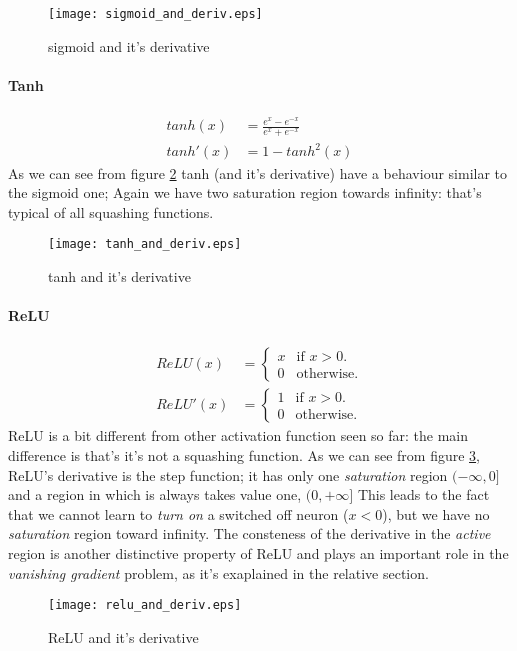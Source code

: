 \begin{figure}[ht]
  \centering
    \texttt{[image: sigmoid\_and\_deriv.eps]}
  \caption{sigmoid and it's derivative}
\label{sigmoid_plot}
\end{figure}

\paragraph{Tanh}
\begin{align}
 tanh(x)&=\frac{e^x-e^{-x}}{e^x+e^{-x}} \\
 tanh'(x)&= 1 - tanh^2(x)  
\end{align}
As we can see from figure \ref{tanh_plot} tanh (and it's derivative) have a behaviour similar to the sigmoid one; Again we have two saturation region towards
infinity: that's typical of all squashing functions.



\begin{figure}[ht]
  \centering
    \texttt{[image: tanh\_and\_deriv.eps]}
  \caption{tanh and it's derivative}
\label{tanh_plot}
\end{figure}



\paragraph{ReLU}


\begin{align}
  ReLU(x)&=\begin{cases}
    x & \text{if $x>0$}.\\
    0 & \text{otherwise}.
  \end{cases} \\ 
   ReLU'(x)&=\begin{cases}
    1 & \text{if $x>0$}.\\
    0 & \text{otherwise}.
  \end{cases}
\end{align}
ReLU is a bit different from other activation function seen so far: the main difference is that's it's not a squashing function.
As we can see from figure \ref{relu_plot}, ReLU's derivative is the step function; it has only one \textit{saturation} region $(-\infty, 0]$ and a region in which is always takes value one, $(0,+\infty]$
This leads to the fact that we cannot learn to \textit{turn on} a switched off neuron ($x<0$), but we have no \textit{saturation} region toward infinity.
The consteness of the derivative in the \textit{active} region is another distinctive property of ReLU and plays an important role in the \textit{vanishing gradient} problem, as it's exaplained in the relative
section.

\begin{figure}[ht]
  \centering
    \texttt{[image: relu\_and\_deriv.eps]}
  \caption{ReLU and it's derivative}
\label{relu_plot}
\end{figure}
